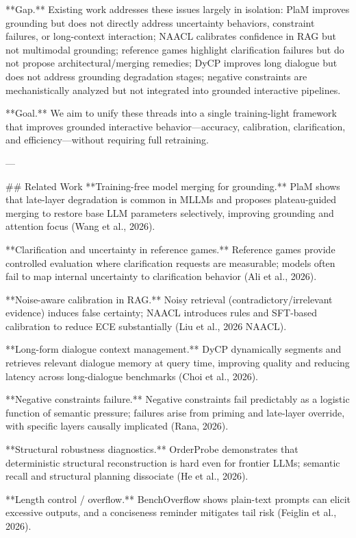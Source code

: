 **Gap.** Existing work addresses these issues largely in isolation: PlaM improves grounding but does not directly address uncertainty behaviors, constraint failures, or long-context interaction; NAACL calibrates confidence in RAG but not multimodal grounding; reference games highlight clarification failures but do not propose architectural/merging remedies; DyCP improves long dialogue but does not address grounding degradation stages; negative constraints are mechanistically analyzed but not integrated into grounded interactive pipelines.  

**Goal.** We aim to unify these threads into a single training-light framework that improves grounded interactive behavior—accuracy, calibration, clarification, and efficiency—without requiring full retraining.

---

## Related Work  
**Training-free model merging for grounding.** PlaM shows that late-layer degradation is common in MLLMs and proposes plateau-guided merging to restore base LLM parameters selectively, improving grounding and attention focus (Wang et al., 2026).  

**Clarification and uncertainty in reference games.** Reference games provide controlled evaluation where clarification requests are measurable; models often fail to map internal uncertainty to clarification behavior (Ali et al., 2026).  

**Noise-aware calibration in RAG.** Noisy retrieval (contradictory/irrelevant evidence) induces false certainty; NAACL introduces rules and SFT-based calibration to reduce ECE substantially (Liu et al., 2026 NAACL).  

**Long-form dialogue context management.** DyCP dynamically segments and retrieves relevant dialogue memory at query time, improving quality and reducing latency across long-dialogue benchmarks (Choi et al., 2026).  

**Negative constraints failure.** Negative constraints fail predictably as a logistic function of semantic pressure; failures arise from priming and late-layer override, with specific layers causally implicated (Rana, 2026).  

**Structural robustness diagnostics.** OrderProbe demonstrates that deterministic structural reconstruction is hard even for frontier LLMs; semantic recall and structural planning dissociate (He et al., 2026).  

**Length control / overflow.** BenchOverflow shows plain-text prompts can elicit excessive outputs, and a conciseness reminder mitigates tail risk (Feiglin et al., 2026).  


